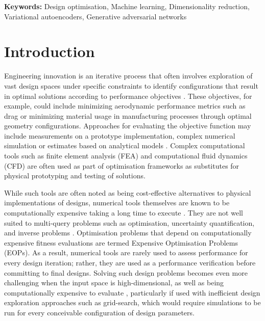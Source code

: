 \documentclass{article}
\begin{document}
\noindent \textbf{Keywords:} Design optimisation, Machine learning, Dimensionality reduction, Variational autoencoders, Generative adversarial networks
\newpage

\tableofcontents  %
\newpage          %

\section{Introduction}

Engineering innovation is an iterative process that often involves exploration of vast design spaces under specific constraints to identify configurations that result in optimal solutions according to performance objectives \cite{Yamada2022}. These objectives, for example, could include minimizing aerodynamic performance metrics such as drag or minimizing material usage in manufacturing processes through optimal geometry configurations. Approaches for evaluating the objective function may include measurements on a prototype implementation, complex numerical simulation or estimates based on analytical models \citep{Pimentel2022}. Complex computational tools such as finite element analysis (FEA) and computational fluid dynamics (CFD) \citep{Archbold2024} are often used as part of optimisation frameworks as substitutes for physical prototyping and testing of solutions. 

While such tools are often noted as being cost-effective alternatives to physical implementations of designs, numerical tools themselves are known to be computationally expensive taking a long time to execute \citep{Shi2010}. They are not well suited to multi-query problems such as optimisation, uncertainty quantification, and inverse problems \citep{Archbold2024}. Optimisation problems that depend on computationally expensive fitness evaluations are termed Expensive Optimisation Problems (EOPs)\citep{Ren2025}. As a result, numerical tools are rarely used to assess performance for every design iteration; rather, they are used as a performance verification before committing to final designs. Solving such design problems becomes even more challenging when the input space is high-dimensional, as well as being computationally expensive to evaluate \citep{Tripp2020}, particularly if used with inefficient design exploration approaches such as grid-search, which would require simulations to be run for every conceivable configuration of design parameters. 
\end{document}
